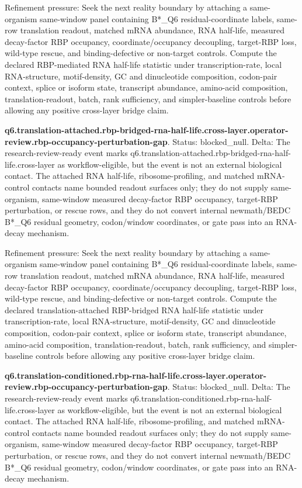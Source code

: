 Refinement pressure: Seek the next reality boundary by attaching a same-organism same-window panel containing B*\_Q6 residual-coordinate labels, same-row translation readout, matched mRNA abundance, RNA half-life, measured decay-factor RBP occupancy, coordinate/occupancy decoupling, target-RBP loss, wild-type rescue, and binding-defective or non-target controls. Compute the declared RBP-mediated RNA half-life statistic under transcription-rate, local RNA-structure, motif-density, GC and dinucleotide composition, codon-pair context, splice or isoform state, transcript abundance, amino-acid composition, translation-readout, batch, rank sufficiency, and simpler-baseline controls before allowing any positive cross-layer bridge claim.

\textbf{q6.translation-attached.rbp-bridged-rna-half-life.cross-layer.operator-review.rbp-occupancy-perturbation-gap}. Status: blocked\_null. Delta: The research-review-ready event marks q6.translation-attached.rbp-bridged-rna-half-life.cross-layer as workflow-eligible, but the event is not an external biological contact. The attached RNA half-life, ribosome-profiling, and matched mRNA-control contacts name bounded readout surfaces only; they do not supply same-organism, same-window measured decay-factor RBP occupancy, target-RBP perturbation, or rescue rows, and they do not convert internal newmath/BEDC B*\_Q6 residual geometry, codon/window coordinates, or gate pass into an RNA-decay mechanism.

Refinement pressure: Seek the next reality boundary by attaching a same-organism same-window panel containing B*\_Q6 residual-coordinate labels, same-row translation readout, matched mRNA abundance, RNA half-life, measured decay-factor RBP occupancy, coordinate/occupancy decoupling, target-RBP loss, wild-type rescue, and binding-defective or non-target controls. Compute the declared translation-attached RBP-bridged RNA half-life statistic under transcription-rate, local RNA-structure, motif-density, GC and dinucleotide composition, codon-pair context, splice or isoform state, transcript abundance, amino-acid composition, translation-readout, batch, rank sufficiency, and simpler-baseline controls before allowing any positive cross-layer bridge claim.

\textbf{q6.translation-conditioned.rbp-rna-half-life.cross-layer.operator-review.rbp-occupancy-perturbation-gap}. Status: blocked\_null. Delta: The research-review-ready event marks q6.translation-conditioned.rbp-rna-half-life.cross-layer as workflow-eligible, but the event is not an external biological contact. The attached RNA half-life, ribosome-profiling, and matched mRNA-control contacts name bounded readout surfaces only; they do not supply same-organism, same-window measured decay-factor RBP occupancy, target-RBP perturbation, or rescue rows, and they do not convert internal newmath/BEDC B*\_Q6 residual geometry, codon/window coordinates, or gate pass into an RNA-decay mechanism.

